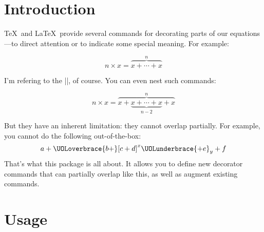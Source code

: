 \documentclass[a4paper]{packagedoc}
\begin{document}

\maketitle

\section{Introduction}                                                         %

\TeX\ and \LaTeX\ provide several commands for decorating parts of our
equations---to direct attention or to indicate some special meaning. For
\hbox{example}:

\begin{latex-example-show}
\[ n \times x = \overbrace{x + \cdots + x}^n \]
\end{latex-example-show}

\noindent I'm refering to the |\overbrace|, of course. You can even nest
such commands:

\begin{latex-example-show}
\[ n \times x =
   \overbrace{x + \underbrace{x + \cdots + x}_{n-2}{} + x}^n \]
\end{latex-example-show}

\noindent But they have an inherent limitation: they cannot overlap partially. For
example, you cannot do the following out-of-the-box:
\[
	a + \UOLoverbrace{b +}[c + d]^x \UOLunderbrace{+ e}_y + f
\]
That's what this package is all about. It allows you to define new
decorator commands that can partially overlap like this, as well as
augment existing commands.

\break

\section{Usage}                                                                %

\end{document}
